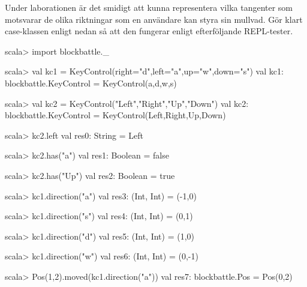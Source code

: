 \Subtask Under laborationen är det smidigt att kunna representera vilka tangenter som motsvarar de olika riktningar som en användare kan styra sin mullvad. Gör klart case-klassen  enligt nedan så att den fungerar enligt efterföljande REPL-tester.
%
\begin{REPL}
scala> import blockbattle._

scala> val kc1 = KeyControl(right="d",left="a",up="w",down="s")
val kc1: blockbattle.KeyControl = KeyControl(a,d,w,s)

scala> val kc2 = KeyControl("Left","Right","Up","Down")
val kc2: blockbattle.KeyControl = KeyControl(Left,Right,Up,Down)

scala> kc2.left
val res0: String = Left

scala> kc2.has("a")
val res1: Boolean = false

scala> kc2.has("Up")
val res2: Boolean = true

scala> kc1.direction("a")
val res3: (Int, Int) = (-1,0)

scala> kc1.direction("s")
val res4: (Int, Int) = (0,1)

scala> kc1.direction("d")
val res5: (Int, Int) = (1,0)

scala> kc1.direction("w")
val res6: (Int, Int) = (0,-1)

scala> Pos(1,2).moved(kc1.direction("a"))
val res7: blockbattle.Pos = Pos(0,2)
\end{REPL}


